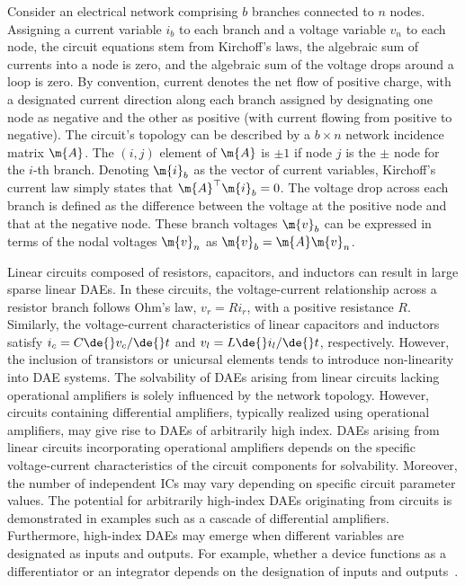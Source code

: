Consider an electrical network comprising $b$ branches connected to $n$ nodes. Assigning a current variable $i_b$ to each branch and a voltage variable $v_n$ to each node, the circuit equations stem from Kirchoff's laws, \ie{} the algebraic sum of currents into a node is zero, and the algebraic sum of the voltage drops around a loop is zero. By convention, current denotes the net flow of positive charge, with a designated current direction along each branch assigned by designating one node as negative and the other as positive (with current flowing from positive to negative). The circuit's topology can be described by a $b \times n$ network incidence matrix $\m{A}$. The $(i,j)$ element of $\m{A}$ is $\pm1$ if node $j$ is the $\pm$ node for the $i$-th branch. Denoting $\m{i}_b$ as the vector of current variables, Kirchoff's current law simply states that $\m{A}^\top\m{i}_b = 0$. The voltage drop across each branch is defined as the difference between the voltage at the positive node and that at the negative node. These branch voltages $\m{v}_b$ can be expressed in terms of the nodal voltages $\m{v}_n$ as $\m{v}_b = \m{A}\m{v}_n$.

Linear circuits composed of resistors, capacitors, and inductors can result in large sparse linear \acp{DAE}. In these circuits, the voltage-current relationship across a resistor branch follows Ohm's law, $v_r = Ri_r$, with a positive resistance $R$. Similarly, the voltage-current characteristics of linear capacitors and inductors satisfy $i_c = C\de{}v_c/\de{}t$ and $v_l = L\de{}i_l/\de{}t$, respectively. However, the inclusion of transistors or unicursal elements tends to introduce non-linearity into \ac{DAE} systems. The solvability of \acp{DAE} arising from linear circuits lacking operational amplifiers is solely influenced by the network topology. However, circuits containing differential amplifiers, typically realized using operational amplifiers, may give rise to \acp{DAE} of arbitrarily high index. \acp{DAE} arising from linear circuits incorporating operational amplifiers depends on the specific voltage-current characteristics of the circuit components for solvability. Moreover, the number of independent \acp{IC} may vary depending on specific circuit parameter values. The potential for arbitrarily high-index \acp{DAE} originating from circuits is demonstrated in examples such as a cascade of differential amplifiers. Furthermore, high-index \acp{DAE} may emerge when different variables are designated as inputs and outputs. For example, whether a device functions as a differentiator or an integrator depends on the designation of inputs and outputs~\cite{brenan1995numerical}.

